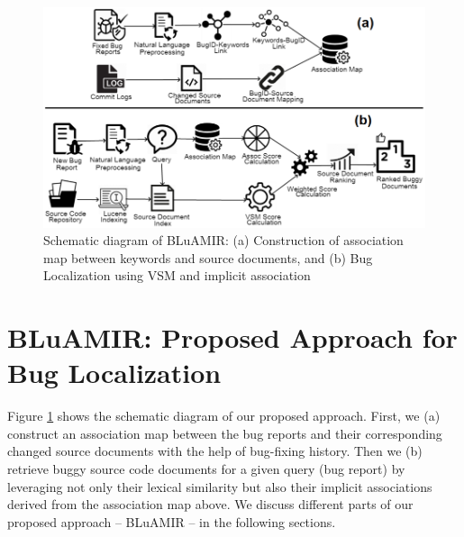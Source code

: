 \documentclass[conference]{IEEEtran}
\begin{document}
\begin{figure}
	\centering
	\includegraphics[width=4.8in]{SD6Trans}
	\vspace{-.2cm}
	\caption{Schematic diagram of BLuAMIR: (a) Construction of association map between keywords and source documents,  and (b) Bug Localization using VSM and implicit association}
	\label{fig:systemDiagram}
		\vspace{-.2cm}
\end{figure}

\section{BLuAMIR: Proposed Approach for Bug Localization} \label{sec:proposedmethod} 
Figure \ref{fig:systemDiagram} shows the schematic diagram of our proposed approach.
First, we (a) construct an association map between the bug reports and their corresponding changed source documents with the help of bug-fixing history.
Then we (b) retrieve buggy source code documents for a given query (bug report) by leveraging not only their lexical similarity but also their implicit associations derived from the association map above.   
We discuss different parts of our proposed approach -- BLuAMIR -- in the following sections.
\end{document}
